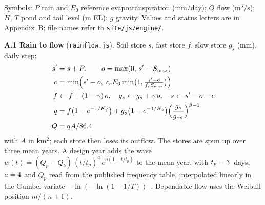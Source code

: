 \documentclass[10pt,a4paper,twocolumn]{extarticle}
\newcommand{\cms}{m$^3$/s}
\newcommand{\kmsq}{km$^2$}
\begin{document}
Symbols: $P$ rain and $E_0$ reference evapotranspiration (mm/day); $Q$ flow (\cms); $H$, $T$ pond and tail level
(m EL); $g$ gravity. Values and status letters are in Appendix~B; file names refer to \texttt{site/js/engine/}.

\textbf{A.1 Rain to flow} (\texttt{rainflow.js}). Soil store $s$, fast store $f$, slow store $g_s$ (mm), daily step:
\begin{align}
s' &= s+P,\qquad o=\max(0,\,s'-S_{\max}) \label{eq:bucket1}\\
e &= \min\!\Big(s'-o,\;c_eE_0\min\!\big(1,\tfrac{s'-o}{f_cS_{\max}}\big)\Big) \notag\\
f &\leftarrow f+(1-\gamma)\,o,\quad g_s\leftarrow g_s+\gamma\,o,\quad s\leftarrow s'-o-e \notag\\
q &= f\big(1-e^{-1/K_f}\big)+g_s\big(1-e^{-1/K_s}\big)\Big(\frac{g_s}{g_{\mathrm{ref}}}\Big)^{\beta-1} \notag\\
Q &= qA/86.4 \label{eq:bucket3}
\end{align}
with $A$ in \kmsq; each store then loses its outflow. The stores are spun up over three mean years. A design year
adds the wave $w(t)=(Q_p-Q_b)\,(t/t_p)^a\,e^{a(1-t/t_p)}$ to the mean year, with $t_p=3$~days,
$a=4$ and $Q_p$ read from the published frequency table, interpolated linearly in the Gumbel variate
$-\ln(-\ln(1-1/T))$~\citep{gumbel1958}. Dependable flow uses the Weibull position $m/(n+1)$.
\end{document}
